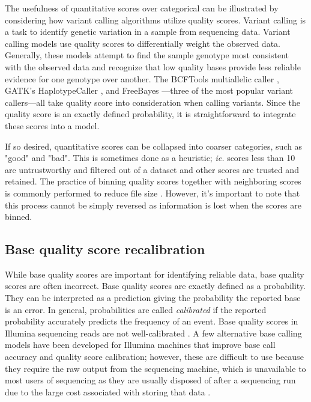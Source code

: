 The usefulness of quantitative scores over categorical can be illustrated by considering how variant calling algorithms utilize quality scores.
Variant calling is a task to identify genetic variation in a sample from sequencing data.
Variant calling models use quality scores to differentially weight the observed data. Generally, these models attempt to find the sample genotype most consistent with the observed data and recognize that low quality bases provide less reliable evidence for one genotype over another. The BCFTools multiallelic caller \parencite{li_sequence_2009}, GATK's HaplotypeCaller \parencite{poplin_scaling_2018}, and FreeBayes \parencite{garrison_haplotype-based_2012}---three of the most popular variant callers---all take quality score into consideration when calling variants.
Since the quality score is an exactly defined probability, it is straightforward to integrate these scores into a model.

If so desired, quantitative scores can be collapsed into coarser categories, such as "good" and "bad". This is sometimes done as a heuristic; \textit{ie.} scores less than 10 are untrustworthy and filtered out of a dataset and other scores are trusted and retained.
The practice of binning quality scores together with neighboring scores is commonly performed to reduce file size \parencite{shibuya_better_2019, malysa_qvz_2015, yu_quality_2015, noauthor_reducing_2014}. 
However, it's important to note that this process cannot be simply reversed as information is lost when the scores are binned.

\subsection{Base quality score recalibration}

While base quality scores are important for identifying reliable data, base quality scores are often incorrect.
Base quality scores are exactly defined as a probability. They can be interpreted as a prediction giving the probability the reported base is an error. In general, probabilities are called \textit{calibrated} if the reported probability accurately predicts the frequency of an event.
Base quality scores in Illumina sequencing reads are not well-calibrated \parencite{callahan_dada2:_2016, ni_improvement_2016}. %
A few alternative base calling models have been developed for Illumina machines that improve base call accuracy and quality score calibration; however, these are difficult to use because they require the raw output from the sequencing machine, which is unavailable to most users of sequencing as they are usually disposed of after a sequencing run due to the large cost associated with storing that data \parencite{kao_naivebayescall_2011, massingham_all_2012}. 


